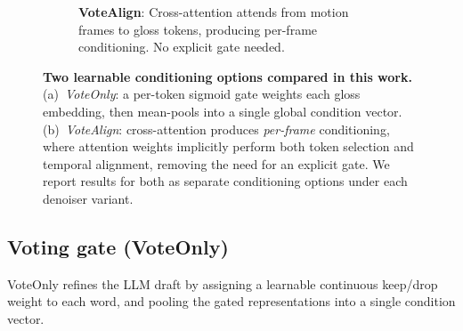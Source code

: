 \documentclass{article}
\begin{document}
\begin{figure}[t]
\begin{subfigure}[t]{0.48\textwidth}
\caption{\textbf{VoteAlign}: Cross-attention attends from motion frames to gloss tokens, producing per-frame conditioning. No explicit gate needed.}
\label{fig:votealign}
\end{subfigure}
\caption{\textbf{Two learnable conditioning options compared in this work.}
(a)~\emph{VoteOnly}: a per-token sigmoid gate weights each gloss embedding, then mean-pools into a single global condition vector.
(b)~\emph{VoteAlign}: cross-attention produces \emph{per-frame} conditioning, where attention weights implicitly perform both token selection and temporal alignment, removing the need for an explicit gate. We report results for both as separate conditioning options under each denoiser variant.}
\label{fig:method_comparison}
\end{figure}

\subsection{Voting gate (VoteOnly)}
\label{sec:voting}

VoteOnly refines the LLM draft by assigning a learnable continuous keep/drop weight to each word, and pooling the gated representations into a single condition vector.
\end{document}
